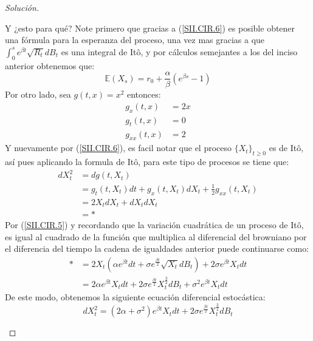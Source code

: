 \documentclass[11pt,notitlepage]{article}
\newenvironment{solucion}
  {\begin{proof}[Solución]}
  {\end{proof}}
\begin{document}
\begin{solucion}
\begin{itemize}
\begin{equation}
           \end{equation}
           Y ¿esto para qué? Note primero que gracias a (\ref{SII.CIR.6}) es posible obtener una fórmula para la esperanza del proceso, una vez mas
           gracias  a que \(\int_{0}^{s}e^{\beta t}\sqrt{R_t}dB_t\) es una integral de Itô, y por cálculos semejantes a los del inciso anterior obtenemos
           que: 
           \begin{equation}\label{SII.CIR.7}
               \mathbb{E}(X_s) =  r_0 +\frac{\alpha}{\beta}\left(e^{\beta s} - 1 \right)
           \end{equation}
           Por otro lado, sea \(g(t,x) = x^2\) entonces: 
           \begin{align*}
               g_{x}(t,x) &= 2x\\
               g_{t}(t,x) &= 0\\
               g_{xx}(t,x)&= 2 
           \end{align*}
           Y nuevamente por (\ref{SII.CIR.6}), es facil notar que el proceso \(\{X_t\}_{t\geq 0}\) es de Itô, así pues aplicando la formula de Itô, para este
           tipo de procesos se tiene que: 
           \begin{align*}
               dX_{t}^{2} &= dg(t,X_t)\\
                          &= g_{t}(t,X_t)dt + g_{x}(t,X_t)dX_t + \frac{1}{2}g_{xx}(t,X_t)\\
                          &= 2X_tdX_t + dX_tdX_t \\
                          &= *
           \end{align*}
           Por (\ref{SII.CIR.5}) y recordando que la variación cuadrática de un proceso de Itô, es igual al cuadrado de la función que multiplica al diferencial del 
           browniano por el diferencia del tiempo la cadena de igualdades anterior puede continuarse como: 
           \begin{align*}
                  * &=2X_t\left(\alpha e^{\beta t}dt + \sigma e^{\frac{\beta t}{2}}\sqrt{X_t}dB_t\right) + 2\sigma e^{\beta t}X_tdt\\
                    &=2\alpha e^{\beta t}X_tdt + 2\sigma e^{\frac{\beta t}{2}}X_{t}^{\frac{3}{2}}dB_t + \sigma^2e^{\beta t}X_tdt
           \end{align*}
           De este modo, obtenemos la siguiente ecuación diferencial estocástica: 
           \begin{equation*}
               dX_{t}^{2} = (2\alpha + \sigma^2 )e^{\beta t}X_tdt + 2\sigma e^{\frac{\beta t}{2}}X_{t}^{\frac{3}{2}}dB_t 

\end{equation*}
\end{itemize}
\end{solucion}
\end{document}
